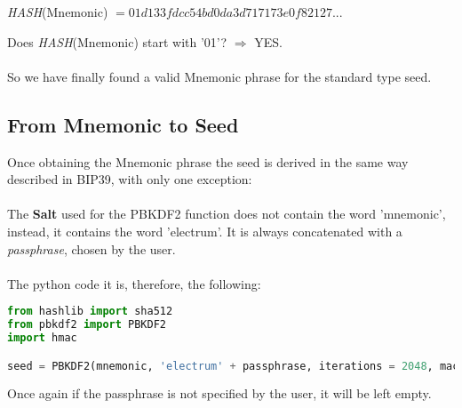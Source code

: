 \begin{center}
	\textit{HASH}(Mnemonic) $= 01d133fdcc54bd0da3d717173e0f82127...$
\end{center}
Does \textit{HASH}(Mnemonic) start with '01'? $\Rightarrow$ YES.
\\ \\
So we have finally found a valid Mnemonic phrase for the standard type seed.


\subsection{From Mnemonic to Seed}
Once obtaining the Mnemonic phrase the seed is derived in the same way described in BIP39, with only one exception:
\\ \\
The \textbf{Salt} used for the PBKDF2 function does not contain the word 'mnemonic', instead, it contains the word 'electrum'. It is always concatenated with a \textit{passphrase}, chosen by the user.
\\ \\
The python code it is, therefore, the following:  

\begin{lstlisting}[language=Python]
from hashlib import sha512
from pbkdf2 import PBKDF2
import hmac

seed = PBKDF2(mnemonic, 'electrum' + passphrase, iterations = 2048, macmodule = hmac, digestmodule = sha512).read(64)
\end{lstlisting}


\begin{flushleft}
	Once again if the passphrase is not specified by the user, it will be left empty.
\end{flushleft}



